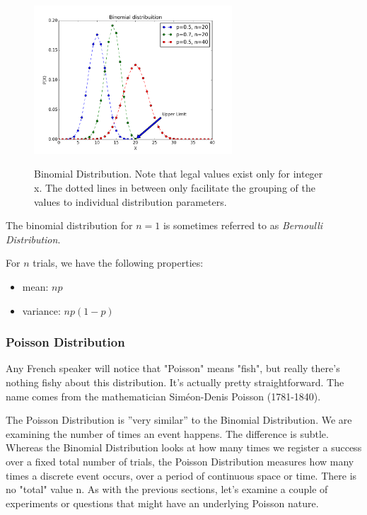 \begin{figure}
  \centering
  \includegraphics[width=0.66\textwidth]{../Images/Binomial_distribution_pmf.png}\\
  \caption{Binomial Distribution. Note that legal values exist only for integer x. The dotted lines in between only facilitate the grouping of the values to individual distribution parameters.}
\end{figure}

The binomial distribution for $n = 1$ is sometimes referred to as \emph{Bernoulli Distribution}.

 For $n$ trials, we have the following properties:

 \begin{itemize}
   \item mean: $np$
   \item variance: $n p (1-p)$
 \end{itemize}

\subsubsection{Poisson Distribution}

Any French speaker will notice that "Poisson" means "fish", but really there's nothing fishy about this distribution. It's actually pretty straightforward. The name comes from the mathematician Siméon-Denis Poisson (1781-1840).

The Poisson Distribution is ''very similar'' to the Binomial Distribution. We are examining the number of times an event happens. The difference is subtle. Whereas the Binomial Distribution looks at how many times we register a success over a fixed total number of trials, the Poisson Distribution measures how many times a discrete event occurs, over a period of continuous space or time. There is no "total" value n. As with the previous sections, let's examine a couple of experiments or questions that might have an underlying Poisson nature.

